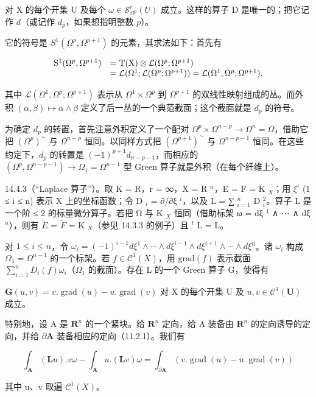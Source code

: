 对 X 的每个开集 U 及每个 \(\omega\in\mathcal{S}_{\Omega^{p}}^{r}(U)\) 成立。这样的算子 D 是唯一的；把它记作 \(d\)（或记作 \(d_{p}\)，如果想指明整数 \(p\)）。

它的符号是 \(S^1(\Omega^p, \Omega^{p+1})\) 的元素，其求法如下：首先有

\[
\begin{array}{r l} \mathrm{S} ^ {1} (\Omega^ {p}, \Omega^ {p + 1}) & = \mathrm{T} (\mathrm{X}) \otimes \mathcal {L} (\Omega^ {p}; \Omega^ {p + 1}) \\ & = \mathcal {L} (\Omega^ {1}; \mathcal {L} (\Omega^ {p}; \Omega^ {p + 1})) = \mathcal {L} (\Omega^ {1}, \Omega^ {p}; \Omega^ {p + 1}), \end{array}
\]

其中 \(\mathcal{L}(\Omega^{1},\Omega^{p};\Omega^{p+1})\) 表示从 \(\Omega^{1}\times\Omega^{p}\) 到 \(\Omega^{p+1}\) 的双线性映射组成的丛。而外积 \((\alpha,\beta)\mapsto\alpha\wedge\beta\) 定义了后一丛的一个典范截面；这个截面就是 \(d_{p}\) 的符号。

为确定 \(d_{p}\) 的转置，首先注意外积定义了一个配对 \(\Omega^{p} \times \Omega^{n-p} \to \Omega^{n} = \Omega\)，借助它把 \((\Omega^{p})^{\sim}\) 与 \(\Omega^{n-p}\) 恒同。以同样方式把 \((\Omega^{p+1})^{\sim}\) 与 \(\Omega^{n-p-1}\) 恒同。在这些约定下，\(d_{p}\) 的转置是 \((-1)^{p+1}d_{n-p-1}\)，而相应的 \((\Omega^{p}, \Omega^{n-p-1}) \to \Omega_{1} = \Omega^{n-1}\) 型 Green 算子就是外积（在每个纤维上）。

14.4.3（“Laplace 算子”）。取 K = R，r = ∞，X = R \(^{n}\)，E = F = K \(_{X}\)；用 \(\xi^{i}\) (1 ≤ i ≤ n) 表示 X 上的坐标函数；令 D \(_{i}\) = ∂/∂ξ \(^{i}\)，以及 L = ∑ \(_{i=1}^{n}\) D \(_{i}^{2}\)。算子 L 是一个阶 ≤ 2 的标量微分算子。若把 Ω 与 K \(_{X}\) 恒同（借助标架 ω = dξ \(^{1}\) ∧ ⋯ ∧ dξ \(^{n}\)），则有 \(\tilde{E}\) = \(\tilde{F}\) = K \(_{X}\)（参见 14.3.3 的例子）且 \(^{t}\) L = L。

对 \(1 \leqslant i \leqslant n\)，令 \(\omega_{i} = (-1)^{i-1} d\xi^{1} \wedge \cdots \wedge d\xi^{i-1} \wedge d\xi^{i+1} \wedge \cdots \wedge d\xi^{n}\)。诸 \(\omega_{i}\) 构成 \(\Omega_{1} = \Omega^{n-1}\) 的一个标架。若 \(f \in \mathcal{C}^{1}(X)\)，用 \(\text{grad}(f)\) 表示截面 \(\sum_{i=1}^{n} D_{i}(f)\omega_{i}\)（\(\Omega_{1}\) 的截面）。存在 L 的一个 Green 算子 G，使得有

\(\mathbf{G}(u,v) = v.\operatorname{grad}(u) - u.\operatorname{grad}(v)\) 对 X 的每个开集 U 及 \(u,v \in \mathcal{C}^{1}(\mathbf{U})\) 成立。

特别地，设 A 是 \(\mathbf{R}^{n}\) 的一个紧块。给 \(\mathbf{R}^{n}\) 定向，给 A 装备由 \(\mathbf{R}^{n}\) 的定向诱导的定向，并给 \(\partial\mathbf{A}\) 装备相应的定向（11.2.1）。我们有

\[
\int_ {\mathbf {A}} (\mathbf {L} u). v \omega - \int_ {\mathbf {A}} u. (\mathbf {L} v) \omega = \int_ {\partial \mathbf {A}} (v. \operatorname{grad} (u) - u. \operatorname{grad} (v))
\]

其中 u、v 取遍 \(\mathcal{C}^{1}(X)\)。

